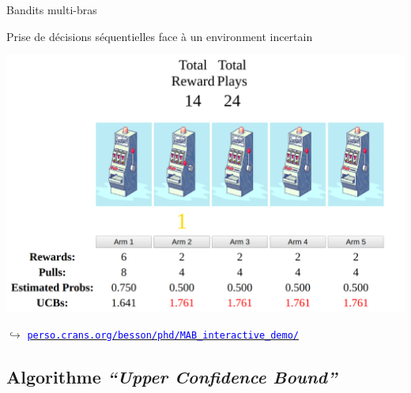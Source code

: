 \documentclass[11pt,english,ignorenonframetext,]{beamer}
\begin{document}

\begin{frame}{Bandits multi-bras}

  Prise de décisions séquentielles face à un environment incertain

  \centering
  \includegraphics[height=0.65\textheight]{figures/example_of_a_5_arm_bandit_problem.png}

  {\tiny
      $\hookrightarrow$ \href{https://perso.crans.org/besson/phd/MAB_interactive_demo/}{\textcolor{blue}{\texttt{perso.crans.org/besson/phd/MAB\_interactive\_demo/}}}
  }

\end{frame}


\subsection{\hfill{}Algorithme \emph{``Upper Confidence Bound''}\hfill{}}
\end{document}
